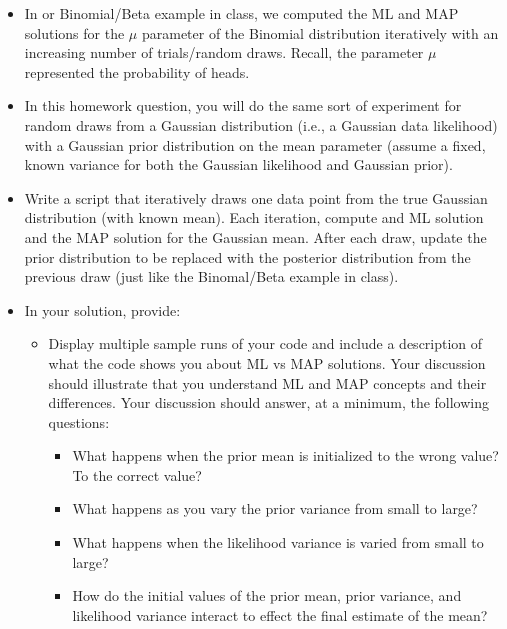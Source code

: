 \documentclass[11pt]{article}
\begin{document}
\begin{itemize}
	\item In or Binomial/Beta example in class, we computed the ML and MAP solutions for the $\mu$ parameter of the Binomial distribution iteratively with an increasing number of trials/random draws. Recall, the parameter $\mu$ represented the probability of heads.
	\item In this homework question, you will do the same sort of experiment for random draws from a Gaussian distribution (i.e., a Gaussian data likelihood) with a Gaussian prior distribution on the mean parameter (assume a fixed, known variance for both the Gaussian likelihood and Gaussian prior).
	\item Write a script that iteratively draws one data point from the true Gaussian distribution (with known mean). Each iteration, compute and ML solution and the MAP solution for the Gaussian mean. After each draw, update the prior distribution to be replaced with the posterior distribution from the previous draw (just like the Binomal/Beta example in class).
	\item In your solution, provide:
		\begin{itemize}
			\item Display multiple sample runs of your code and include a description of what the code shows you about ML vs MAP solutions. Your discussion should illustrate that you understand ML and MAP concepts and their differences. Your discussion should answer, at a minimum, the following questions:
			\begin{itemize}
				\item What happens when the prior mean is initialized to the wrong value? To the correct value?
				\item What happens as you vary the prior variance from small to large?
				\item What happens when the likelihood variance is varied from small to large?
				\item How do the initial values of the prior mean, prior variance, and likelihood variance interact to effect the final estimate of the mean?
			\end{itemize}
		\end{itemize}
\end{itemize}
\end{document}
